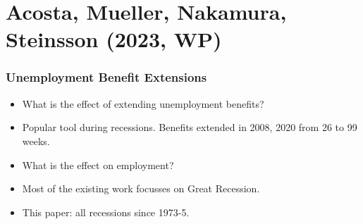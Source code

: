 \documentclass[english,xcolor=svgnames]{beamer}
\begin{document}
\section{Acosta, Mueller, Nakamura, Steinsson (2023, WP)}

\begin{frame}
	\frametitle[alignment=center]{Unemployment Benefit Extensions}
	\begin{itemize}
		\item What is the effect of extending unemployment benefits?
		\item Popular tool during recessions. Benefits extended in 2008, 2020 from 26 to 99 weeks.
		\item What is the effect on employment?
		\item Most of the existing work focusses on Great Recession.
		\item This paper: all recessions since 1973-5.
	\end{itemize}
\end{frame}
\end{document}
